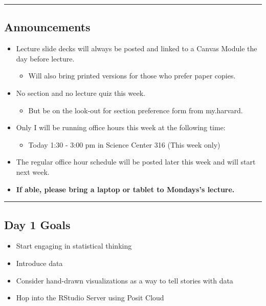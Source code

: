 \documentclass[
  letterpaper,
  DIV=11,
  numbers=noendperiod]{scrartcl}
\providecommand{\tightlist}{%
  \setlength{\itemsep}{0pt}\setlength{\parskip}{0pt}}\usepackage{longtable,booktabs,array}
\begin{document}
\begin{center}\rule{0.5\linewidth}{0.5pt}\end{center}

\hypertarget{announcements}{%
\subsection{Announcements}\label{announcements}}

\begin{itemize}
\item
  Lecture slide decks will always be posted and linked to a Canvas
  Module the day before lecture.

  \begin{itemize}
  \tightlist
  \item
    Will also bring printed versions for those who prefer paper copies.
  \end{itemize}
\item
  No section and no lecture quiz this week.

  \begin{itemize}
  \tightlist
  \item
    But be on the look-out for section preference form from my.harvard.
  \end{itemize}
\item
  Only I will be running office hours this week at the following time:

  \begin{itemize}
  \tightlist
  \item
    Today 1:30 - 3:00 pm in Science Center 316 (This week only)
  \end{itemize}
\item
  The regular office hour schedule will be posted later this week and
  will start next week.
\item
  \textbf{If able, please bring a laptop or tablet to Mondays's
  lecture.}
\end{itemize}

\begin{center}\rule{0.5\linewidth}{0.5pt}\end{center}

\hypertarget{day-1-goals}{%
\subsection{Day 1 Goals}\label{day-1-goals}}

\begin{itemize}
\item
  Start engaging in statistical thinking
\item
  Introduce data
\item
  Consider hand-drawn visualizations as a way to tell stories with data
\item
  Hop into the RStudio Server using Posit Cloud
\end{itemize}
\end{document}
